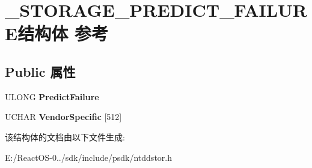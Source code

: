 \hypertarget{struct___s_t_o_r_a_g_e___p_r_e_d_i_c_t___f_a_i_l_u_r_e}{}\section{\+\_\+\+S\+T\+O\+R\+A\+G\+E\+\_\+\+P\+R\+E\+D\+I\+C\+T\+\_\+\+F\+A\+I\+L\+U\+R\+E结构体 参考}
\label{struct___s_t_o_r_a_g_e___p_r_e_d_i_c_t___f_a_i_l_u_r_e}
\subsection*{Public 属性}
\begin{DoxyCompactItemize}
\item 
\mbox{\label{struct___s_t_o_r_a_g_e___p_r_e_d_i_c_t___f_a_i_l_u_r_e_a01a9ea867e5fa3bcc9341381f07d8f3b}} 
U\+L\+O\+NG {\bfseries Predict\+Failure}
\item 
\mbox{\label{struct___s_t_o_r_a_g_e___p_r_e_d_i_c_t___f_a_i_l_u_r_e_a310063a338348167cf93fa14f95c75a6}} 
U\+C\+H\+AR {\bfseries Vendor\+Specific} \mbox{[}512\mbox{]}
\end{DoxyCompactItemize}


该结构体的文档由以下文件生成\+:\begin{DoxyCompactItemize}
\item 
E\+:/\+React\+O\+S-\/0../sdk/include/psdk/ntddstor.\+h\end{DoxyCompactItemize}
